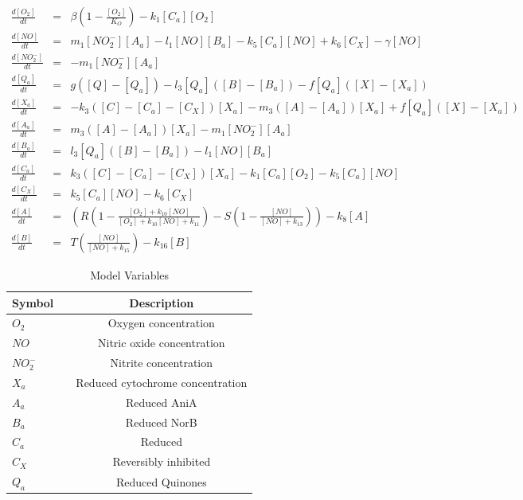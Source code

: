 \begin{eqnarray}
\frac{d[O_2]}{dt} & = & \beta\left(1-\frac{[O_2]}{K_O}\right) - k_{1}[C_a][O_2] \nonumber \\
\frac{d[NO]}{dt} & = & m_{1}[NO_2^-][A_a] - l_1[NO][B_a] - k_5[C_a][NO] + k_6[C_X] - \gamma[NO] \nonumber \\
\frac{d[NO_2^-]}{dt} & = & - m_{1}[NO_2^-][A_a] \nonumber \\
\frac{d[Q_a]}{dt} & = & g([Q] - [Q_a]) - l_3[Q_a]([B] - [B_a]) - f[Q_a]([X]-[X_a])\ \nonumber \\
\frac{d[X_a]}{dt} & = & -k_3([C] - [C_a] - [C_X])[X_a] - m_3([A] - [A_a])[X_a] + f[Q_a]([X]-[X_a]) \nonumber \\
\frac{d[A_a]}{dt} & = & m_3([A] - [A_a])[X_a] - m_{1}[NO_2^-][A_a] \nonumber \\
\frac{d[B_a]}{dt} & = & l_3[Q_a]([B] - [B_a]) - l_1[NO][B_a] \nonumber \\
\frac{d[C_a]}{dt} & = & k_3([C] - [C_a] - [C_X])[X_a] - k_{1}[C_a][O_2] - k_{5}[C_a][NO] \nonumber \\
\frac{d[C_X]}{dt} & = & k_5[C_a][NO] - k_6 [C_X] \nonumber \\
\frac{d[A]}{dt} & = & \left(R\left(1 - \frac{[O_2] + k_{10}[NO]}{[O_2] + k_{10}[NO] + k_{11}}\right) - S\left(1 - \frac{[NO]}{[NO] + k_{13}}\right)\right) - k_8[A] \nonumber \\
\frac{d[B]}{dt} & = & T \left(\frac{[NO]}{[NO] + k_{15}}\right) - k_{16}[B]
\end{eqnarray}

\begin{table}[ht]
\begin{center}
\begin{tabular}{lcc}
\toprule
\textbf{Symbol} & & \textbf{Description}\\
\midrule
$O_2$ & & Oxygen concentration\\
$NO$ & & Nitric oxide concentration\\
$NO_2^-$ & & Nitrite concentration\\
$X_a$ & & Reduced cytochrome concentration\\
$A_a$& & Reduced AniA\\
$B_a$& & Reduced NorB\\
$C_a$& & Reduced \cbbthree{}\\
$C_X$& & Reversibly inhibited \cbbthree{}\\
$Q_a$& & Reduced Quinones\\
\bottomrule
\end{tabular}
\caption{Model Variables
\label{vs}}
\end{center}
\end{table}



